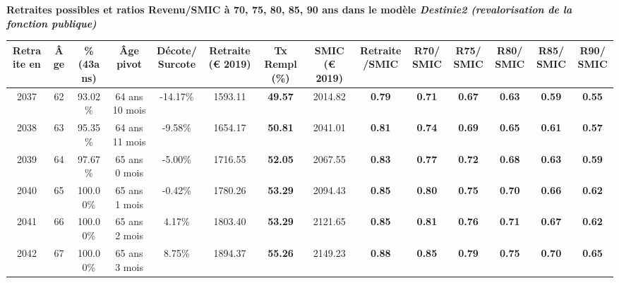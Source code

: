  \vspace{0.1cm} 
{\bf \noindent Retraites possibles et ratios Revenu/SMIC à 70, 75, 80, 85, 90 ans dans le modèle \emph{Destinie2 (revalorisation de la fonction publique)}}  
 
\begin{adjustbox}{max width=\textwidth} 
\begin{tabular}[htb]{|c|c||c|c|c||c|c||c|c||c|c|c|c|c|} 
\hline 
 Retraite en &  Âge &  \%(43ans) &  Âge pivot &  Décote/Surcote &  Retraite (\euro{} 2019) &  Tx Rempl(\%) &  SMIC (\euro{} 2019) &  Retraite/SMIC &  R70/SMIC &  R75/SMIC &  R80/SMIC &  R85/SMIC &  R90/SMIC \\ 
\hline \hline 
 2037 &  62 &  93.02\% &  64 ans 10 mois &  -14.17\% &  1593.11 &  {\bf 49.57} &  2014.82 &  {\bf {\color{red} 0.79}} &  {\bf {\color{red} 0.71}} &  {\bf {\color{red} 0.67}} &  {\bf {\color{red} 0.63}} &  {\bf {\color{red} 0.59}} &  {\bf {\color{red} 0.55}} \\ 
\hline 
 2038 &  63 &  95.35\% &  64 ans 11 mois &  -9.58\% &  1654.17 &  {\bf 50.81} &  2041.01 &  {\bf {\color{red} 0.81}} &  {\bf {\color{red} 0.74}} &  {\bf {\color{red} 0.69}} &  {\bf {\color{red} 0.65}} &  {\bf {\color{red} 0.61}} &  {\bf {\color{red} 0.57}} \\ 
\hline 
 2039 &  64 &  97.67\% &  65 ans 0 mois &  -5.00\% &  1716.55 &  {\bf 52.05} &  2067.55 &  {\bf {\color{red} 0.83}} &  {\bf {\color{red} 0.77}} &  {\bf {\color{red} 0.72}} &  {\bf {\color{red} 0.68}} &  {\bf {\color{red} 0.63}} &  {\bf {\color{red} 0.59}} \\ 
\hline 
 2040 &  65 &  100.00\% &  65 ans 1 mois &  -0.42\% &  1780.26 &  {\bf 53.29} &  2094.43 &  {\bf {\color{red} 0.85}} &  {\bf {\color{red} 0.80}} &  {\bf {\color{red} 0.75}} &  {\bf {\color{red} 0.70}} &  {\bf {\color{red} 0.66}} &  {\bf {\color{red} 0.62}} \\ 
\hline 
 2041 &  66 &  100.00\% &  65 ans 2 mois &  4.17\% &  1803.40 &  {\bf 53.29} &  2121.65 &  {\bf {\color{red} 0.85}} &  {\bf {\color{red} 0.81}} &  {\bf {\color{red} 0.76}} &  {\bf {\color{red} 0.71}} &  {\bf {\color{red} 0.67}} &  {\bf {\color{red} 0.62}} \\ 
\hline 
 2042 &  67 &  100.00\% &  65 ans 3 mois &  8.75\% &  1894.37 &  {\bf 55.26} &  2149.23 &  {\bf {\color{red} 0.88}} &  {\bf {\color{red} 0.85}} &  {\bf {\color{red} 0.79}} &  {\bf {\color{red} 0.75}} &  {\bf {\color{red} 0.70}} &  {\bf {\color{red} 0.65}} \\ 
\hline 
\hline 
\end{tabular} 
\end{adjustbox} 
 
